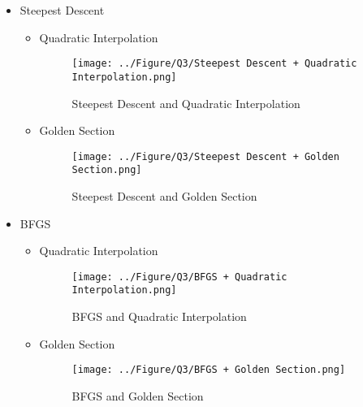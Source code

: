 \begin{itemize}
	\item Steepest Descent
	\begin{itemize}
		\item Quadratic Interpolation
		\begin{figure}[H]
			\caption{Steepest Descent and Quadratic Interpolation}
			\centering
			\texttt{[image: ../Figure/Q3/Steepest Descent + Quadratic Interpolation.png]}
		\end{figure}
	\newpage
		\item Golden Section
		\begin{figure}[H]
			\caption{Steepest Descent and Golden Section}
			\centering
			\texttt{[image: ../Figure/Q3/Steepest Descent + Golden Section.png]}
		\end{figure}
	\end{itemize}
\newpage
	\item BFGS
	\begin{itemize}
		\item Quadratic Interpolation
		\begin{figure}[H]
			\caption{BFGS and Quadratic Interpolation}
			\centering
			\texttt{[image: ../Figure/Q3/BFGS + Quadratic Interpolation.png]}
		\end{figure}
		\item Golden Section
		\begin{figure}[H]
			\caption{BFGS and Golden Section}
			\centering
			\texttt{[image: ../Figure/Q3/BFGS + Golden Section.png]}
		\end{figure}
	\end{itemize}
\end{itemize}
